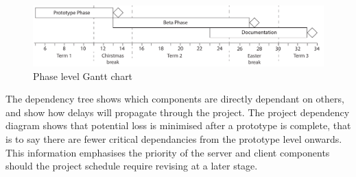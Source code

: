 \begin{figure}[h!]
	\includegraphics{res/gantt_chart_annotated}
	\caption{Phase level Gantt chart}
\end{figure}

The dependency tree shows which components are directly dependant on others, and show how delays will propagate through the project. The project dependency diagram shows that potential loss is minimised after a prototype is complete, that is to say there are fewer critical dependancies from the prototype level onwards. This information emphasises the priority of the server and client components should the project schedule require revising at a later stage.






